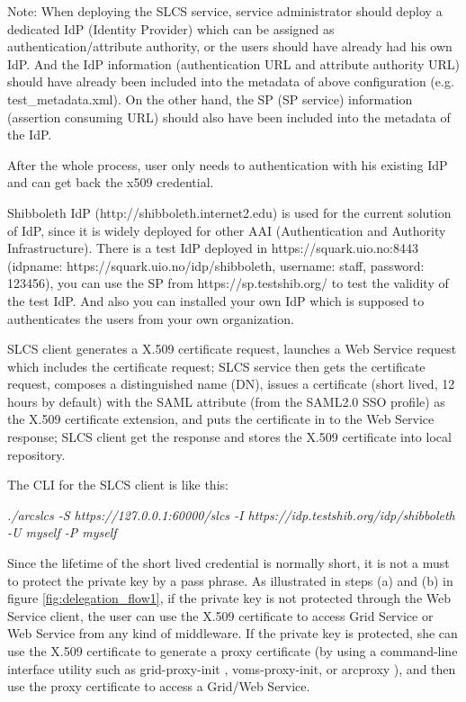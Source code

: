 \documentclass{article}                            %
\begin{document}
Note: When deploying the SLCS service, service administrator should deploy a dedicated IdP (Identity Provider) which can be assigned as authentication/attribute authority, or the users should have already had his own IdP. And the IdP information (authentication URL and attribute authority URL) should have already been included into the metadata of above configuration (e.g. test\_metadata.xml). On the other hand, the SP (SP service) information (assertion consuming URL) should also have been included into the metadata of the IdP.

    After the whole process, user only needs to authentication with his existing IdP and can get back the x509 credential.

    Shibboleth IdP (http://shibboleth.internet2.edu) is used for the current solution of IdP, since it is widely deployed for other AAI (Authentication and Authority Infrastructure). There is a test IdP deployed in https://squark.uio.no:8443 (idpname: https://squark.uio.no/idp/shibboleth, username: staff, password: 123456), you can use the SP from https://sp.testshib.org/ to test the validity of the test IdP. And also you can installed your own IdP which is supposed to authenticates the users from your own organization.

    SLCS client generates  a X.509 certificate  request, launches a Web Service request which includes the certificate request; SLCS service then gets the certificate request, composes a distinguished name (DN), issues a certificate (short lived, 12 hours by default) with the SAML attribute (from the SAML2.0 SSO profile) as the X.509 certificate extension, and puts the certificate in to the Web Service response; SLCS client get the response and stores the X.509 certificate into local repository.

The CLI for the SLCS client is like this:

\textit{./arcslcs -S https://127.0.0.1:60000/slcs -I https://idp.testshib.org/idp/shibboleth -U myself -P myself}

    Since the lifetime of the short lived credential is normally short, it is not a must to protect the private key by a pass phrase. As illustrated in steps (a) and (b) in figure \ref{fig:delegation_flow1}, if the private key is not protected through the Web Service client, the user can use the X.509 certificate to access Grid Service or Web Service from any kind of middleware. If the private key is protected, she can use the X.509 certificate to generate a proxy certificate (by using a command-line interface utility such as grid-proxy-init , voms-proxy-init, or arcproxy ), and then use the proxy certificate to access a Grid/Web Service.
\end{document}
